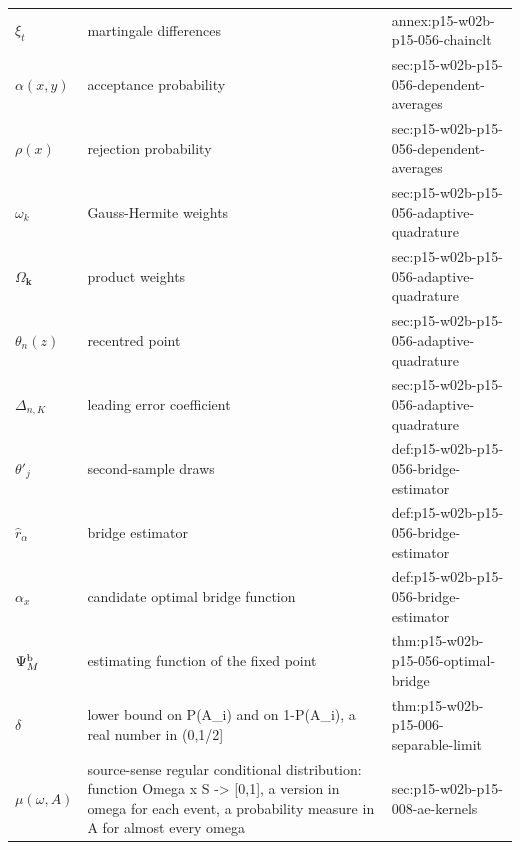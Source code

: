 \begin{longtable}{@{}p{}p{}p{}@{}}
\(\xi_t\) & martingale differences & annex:\allowbreak{}p15-\allowbreak{}w02b-\allowbreak{}p15-\allowbreak{}056-\allowbreak{}chainclt \\
\(\alpha(x,\allowbreak y)\) & acceptance probability & sec:\allowbreak{}p15-\allowbreak{}w02b-\allowbreak{}p15-\allowbreak{}056-\allowbreak{}dependent-\allowbreak{}averages \\
\(\rho(x)\) & rejection probability & sec:\allowbreak{}p15-\allowbreak{}w02b-\allowbreak{}p15-\allowbreak{}056-\allowbreak{}dependent-\allowbreak{}averages \\
\(\omega_k\) & Gauss-Hermite weights & sec:\allowbreak{}p15-\allowbreak{}w02b-\allowbreak{}p15-\allowbreak{}056-\allowbreak{}adaptive-\allowbreak{}quadrature \\
\(\Omega_{\mathbf k}\) & product weights & sec:\allowbreak{}p15-\allowbreak{}w02b-\allowbreak{}p15-\allowbreak{}056-\allowbreak{}adaptive-\allowbreak{}quadrature \\
\(\theta_n(z)\) & recentred point & sec:\allowbreak{}p15-\allowbreak{}w02b-\allowbreak{}p15-\allowbreak{}056-\allowbreak{}adaptive-\allowbreak{}quadrature \\
\(\Delta_{n,K}\) & leading error coefficient & sec:\allowbreak{}p15-\allowbreak{}w02b-\allowbreak{}p15-\allowbreak{}056-\allowbreak{}adaptive-\allowbreak{}quadrature \\
\(\theta'_j\) & second-sample draws & def:\allowbreak{}p15-\allowbreak{}w02b-\allowbreak{}p15-\allowbreak{}056-\allowbreak{}bridge-\allowbreak{}estimator \\
\(\widehat r_\alpha\) & bridge estimator & def:\allowbreak{}p15-\allowbreak{}w02b-\allowbreak{}p15-\allowbreak{}056-\allowbreak{}bridge-\allowbreak{}estimator \\
\(\alpha_x\) & candidate optimal bridge function & def:\allowbreak{}p15-\allowbreak{}w02b-\allowbreak{}p15-\allowbreak{}056-\allowbreak{}bridge-\allowbreak{}estimator \\
\(\Psi^{\rm b}_M\) & estimating function of the fixed point & thm:\allowbreak{}p15-\allowbreak{}w02b-\allowbreak{}p15-\allowbreak{}056-\allowbreak{}optimal-\allowbreak{}bridge \\
\(\delta\) & lower bound on P(A\_i) and on 1-P(A\_i), a real number in (0,1/2] & thm:\allowbreak{}p15-\allowbreak{}w02b-\allowbreak{}p15-\allowbreak{}006-\allowbreak{}separable-\allowbreak{}limit \\
\(\mu(\omega,\allowbreak A)\) & source-sense regular conditional distribution: function Omega x S -> [0,1], a version in omega for each event, a probability measure in A for almost every omega & sec:\allowbreak{}p15-\allowbreak{}w02b-\allowbreak{}p15-\allowbreak{}008-\allowbreak{}ae-\allowbreak{}kernels \\

\end{longtable}
